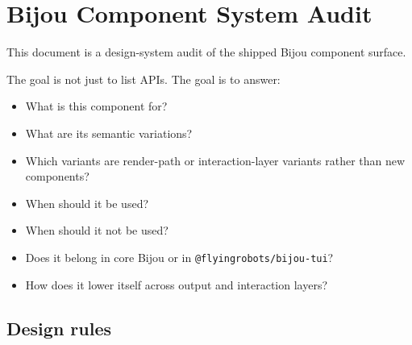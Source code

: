 \chapter{Bijou Component System Audit}\label{record-425}

\smallskip

This document is a design-system audit of the shipped Bijou component surface.

The goal is not just to list APIs. The goal is to answer:

\begin{itemize}
\tightlist
\item
  What is this component for?
\item
  What are its semantic variations?
\item
  Which variants are render-path or interaction-layer variants rather than new components?
\item
  When should it be used?
\item
  When should it not be used?
\item
  Does it belong in core Bijou or in \texttt{@\allowbreak{}f\allowbreak{}l\allowbreak{}y\allowbreak{}i\allowbreak{}n\allowbreak{}g\allowbreak{}r\allowbreak{}o\allowbreak{}b\allowbreak{}o\allowbreak{}t\allowbreak{}s\allowbreak{}/\allowbreak{}b\allowbreak{}i\allowbreak{}j\allowbreak{}o\allowbreak{}u\allowbreak{}-\allowbreak{}t\allowbreak{}u\allowbreak{}i}?
\item
  How does it lower itself across output and interaction layers?
\end{itemize}

\section{Design rules}\label{record-425-design-rules}

